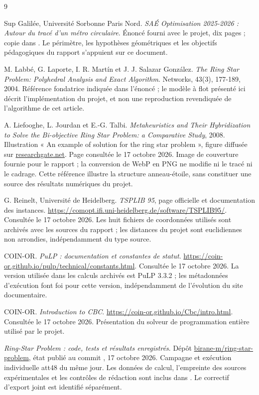 \renewcommand{\bibname}{Références}
\begin{thebibliography}{9}
Sup Galilée, Université Sorbonne Paris Nord.
\textit{SAÉ Optimisation 2025-2026 : Autour du tracé d'un métro circulaire}.
Énoncé fourni avec le projet, dix pages ; copie dans
. Le périmètre, les hypothèses géométriques
et les objectifs pédagogiques du rapport s'appuient sur ce document.

M. Labbé, G. Laporte, I. R. Martín et J. J. Salazar González.
\textit{The Ring Star Problem: Polyhedral Analysis and Exact Algorithm}.
Networks, 43(3), 177-189, 2004. Référence fondatrice indiquée dans
l'énoncé ; le modèle à flot présenté ici décrit l'implémentation du projet,
et non une reproduction revendiquée de l'algorithme de cet article.

A. Liefooghe, L. Jourdan et E.-G. Talbi.
\textit{Metaheuristics and Their Hybridization to Solve the Bi-objective Ring
Star Problem: a Comparative Study}, 2008.
Illustration « An example of solution for the ring star problem »,
figure diffusée sur
\href{https://www.researchgate.net/figure/An-example-of-solution-for-the-ring-star-problem_fig2_1920886}{researchgate.net}.
Page consultée le 17 octobre 2026. Image de couverture fournie pour le rapport ;
la conversion de WebP en PNG ne modifie ni le tracé ni le cadrage.
Cette référence illustre la structure anneau-étoile, sans constituer une
source des résultats numériques du projet.

G. Reinelt, Université de Heidelberg.
\textit{TSPLIB 95}, page officielle et documentation des instances.
\url{https://comopt.ifi.uni-heidelberg.de/software/TSPLIB95/}.
Consultée le 17 octobre 2026. Les huit fichiers de coordonnées utilisés
sont archivés avec les sources du rapport ; les distances du projet
sont euclidiennes non arrondies, indépendamment du type source.

COIN-OR. \textit{PuLP : documentation et constantes de statut}.
\url{https://coin-or.github.io/pulp/technical/constants.html}.
Consultée le 17 octobre 2026. La version utilisée dans les calculs
archivés est PuLP 3.3.2 ; les métadonnées d'exécution font foi pour
cette version, indépendamment de l'évolution du site documentaire.

COIN-OR. \textit{Introduction to CBC}.
\url{https://coin-or.github.io/Cbc/intro.html}.
Consultée le 17 octobre 2026. Présentation du solveur de programmation
entière utilisé par le projet.

\textit{Ring-Star Problem : code, tests et résultats enregistrés}.
Dépôt \href{https://github.com/birane-m/ring-star-problem}{birane-m/ring-star-problem},
état publié au commit , 17 octobre 2026.
Campagne  et exécution individuelle att48 du même jour.
Les données de calcul, l'empreinte des sources expérimentales et les
contrôles de rédaction sont inclus dans .
Le correctif d'export joint est identifié séparément.
\end{thebibliography}
